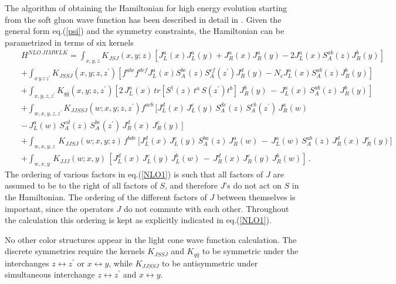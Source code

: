 \documentclass[11pt,a4paper]{article}
\begin{document}
The algorithm of obtaining the Hamiltonian for high energy evolution starting from the soft gluon wave function has been described in detail in \cite{KL}. 
Given the general form eq.(\ref{psi}) and the symmetry constraints, the Hamiltonian can be parametrized in terms of six kernels
\begin{eqnarray}\label{NLO1}
&&H^{NLO\ JIMWLK}= \int_{x,y,z} K_{JSJ}(x,y;z) \left[ J^a_L(x)J^a_L(y)+J_R^a(x)J_R^a(y)-2J_L^a(x)S_A^{ab}(z)J^b_R(y)\right]  \nonumber \\
 &&+\int_{x\,y\, z\,z^\prime}K_{JSSJ}(x,y;z,z^\prime)\left[f^{abc}f^{def}J_L^a(x) S^{be}_A(z)S^{cf}_A(z^\prime)J_R^d(y)- N_c J_L^a(x)S^{ab}_A(z)J^b_R(y)\right] 
 \nonumber \\
 &&+\int_{x,y, z,z^\prime} K_{q\bar q}(x,y;z,z^\prime)\left[2\,J_L^a(x) \,tr[S^\dagger(z)\, t^a\,S (z^\prime)t^b]\,J_R^b(y)\,
 -\, J_L^a(x)\,S^{ab}_A(z)\,J^b_R(y)\right] \nonumber \\
 &&+\int_{w,x,y, z,z^\prime}K_{JJSSJ}(w;x,y;z,z^\prime)f^{acb}\,\Big[J_L^d(x)\, J_L^e(y)\, S^{dc}_A(z)\,S^{eb}_A(z^\prime)\,J_R^a(w)\nonumber \\
 &&-\,J_L^a(w)\,S^{cd}_A(z)\,S^{be}_A (z^\prime)\,J_R^d(x)\,J_R^e(y)\,\Big] \nonumber \\
 &&+\int_{w,x,y, z}\, K_{JJSJ}(w;x,y;z)\,f^{bde}\,\Big[  J_L^d(x) \,J_L^e(y) \,S^{ba}_A(z)\,J_R^a(w)\,-\, 
J_L^a(w)\,S^{ab}_A(z)\,J_R^d(x)\,J_R^e(y)\Big]  \,  \nonumber \\
 &&+\int_{w,x,y}\, K_{JJJ}(w;x,y)\,[J_L^d(x) \,J_L^e(y) \,J_L^b(w)\,-\, 
J_R^d(x)\,J_R^e(y)\,J_R^b(w)]\,.
\end{eqnarray}
The ordering of various factors in eq.(\ref{NLO1}) is such that all factors of $J$ are assumed to be to the right of all factors of $S$, and therefore $J$'s do not act on $S$ in the Hamiltonian. The ordering of the different factors of $J$ between themselves is important, since the operators $J$ do not commute with each other. Throughout the calculation this ordering is kept as explicitly indicated in eq.(\ref{NLO1}).

No other color structures appear in the light cone wave function calculation. The discrete symmetries require the kernels $K_{JSSJ}$ and $K_{q\bar q}$
to be symmetric under the interchanges $z\leftrightarrow z^\prime$ or $x\leftrightarrow y$, while  $K_{JJSSJ}$ to be antisymmetric under simultaneous 
 interchange $z\leftrightarrow z^\prime$ and  $x\leftrightarrow y$. 
 
\end{document}
